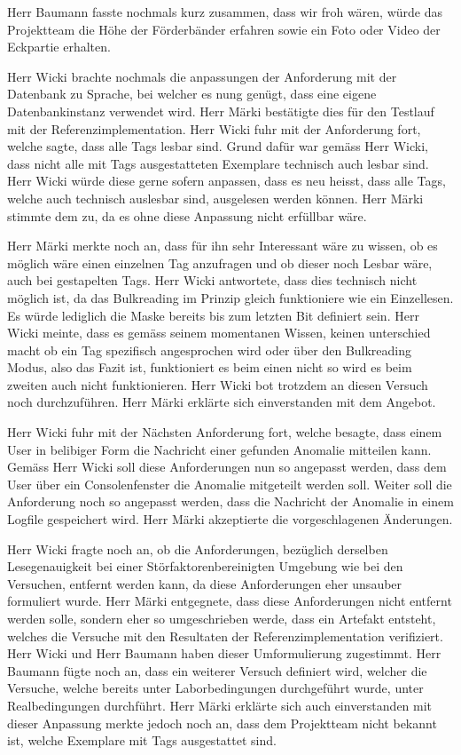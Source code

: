 \documentclass[parskip=full, a4paper]{scrreprt}
\begin{document}
Herr Baumann fasste nochmals kurz zusammen, dass wir froh wären, würde das Projektteam die Höhe der Förderbänder erfahren sowie ein Foto oder Video der Eckpartie erhalten.

Herr Wicki brachte nochmals die anpassungen der Anforderung mit der Datenbank zu Sprache, bei welcher es nung genügt, dass eine eigene Datenbankinstanz verwendet wird. Herr Märki bestätigte dies für den Testlauf mit der Referenzimplementation. Herr Wicki fuhr mit der Anforderung fort, welche sagte, dass alle Tags lesbar sind. Grund dafür war gemäss Herr Wicki, dass nicht alle mit Tags ausgestatteten Exemplare technisch auch lesbar sind. Herr Wicki würde diese gerne sofern anpassen, dass es neu heisst, dass alle Tags, welche auch technisch auslesbar sind, ausgelesen werden können. Herr Märki stimmte dem zu, da es ohne diese Anpassung nicht erfüllbar wäre.

Herr Märki merkte noch an, dass für ihn sehr Interessant wäre zu wissen, ob es möglich wäre einen einzelnen Tag anzufragen und ob dieser noch Lesbar wäre, auch bei gestapelten Tags. Herr Wicki antwortete, dass dies technisch nicht möglich ist, da das Bulkreading im Prinzip gleich funktioniere wie ein Einzellesen. Es würde lediglich die Maske bereits bis zum letzten Bit definiert sein. Herr Wicki meinte, dass es gemäss seinem momentanen Wissen, keinen unterschied macht ob ein Tag spezifisch angesprochen wird oder über den Bulkreading Modus, also das Fazit ist, funktioniert es beim einen nicht so wird es beim zweiten auch nicht funktionieren. Herr Wicki bot trotzdem an diesen Versuch noch durchzuführen. Herr Märki erklärte sich einverstanden mit dem Angebot.

Herr Wicki fuhr mit der Nächsten Anforderung fort, welche besagte, dass einem User in belibiger Form die Nachricht einer gefunden Anomalie mitteilen kann. Gemäss Herr Wicki soll diese Anforderungen nun so angepasst werden, dass dem User über ein Consolenfenster die Anomalie mitgeteilt werden soll. Weiter soll die Anforderung noch so angepasst werden, dass die Nachricht der Anomalie in einem Logfile gespeichert wird. Herr Märki akzeptierte die vorgeschlagenen Änderungen.

Herr Wicki fragte noch an, ob die Anforderungen, bezüglich derselben Lesegenauigkeit bei einer Störfaktorenbereinigten Umgebung wie bei den Versuchen, entfernt werden kann, da diese Anforderungen eher unsauber formuliert wurde. Herr Märki entgegnete, dass diese Anforderungen nicht entfernt werden solle, sondern eher so umgeschrieben werde, dass ein Artefakt entsteht, welches die Versuche mit den Resultaten der Referenzimplementation verifiziert. Herr Wicki und Herr Baumann haben dieser Umformulierung zugestimmt.
Herr Baumann fügte noch an, dass ein weiterer Versuch definiert wird, welcher die Versuche, welche bereits unter Laborbedingungen durchgeführt wurde, unter Realbedingungen durchführt. Herr Märki erklärte sich auch einverstanden mit dieser Anpassung merkte jedoch noch an, dass dem Projektteam nicht bekannt ist, welche Exemplare mit Tags ausgestattet sind.
\end{document}

